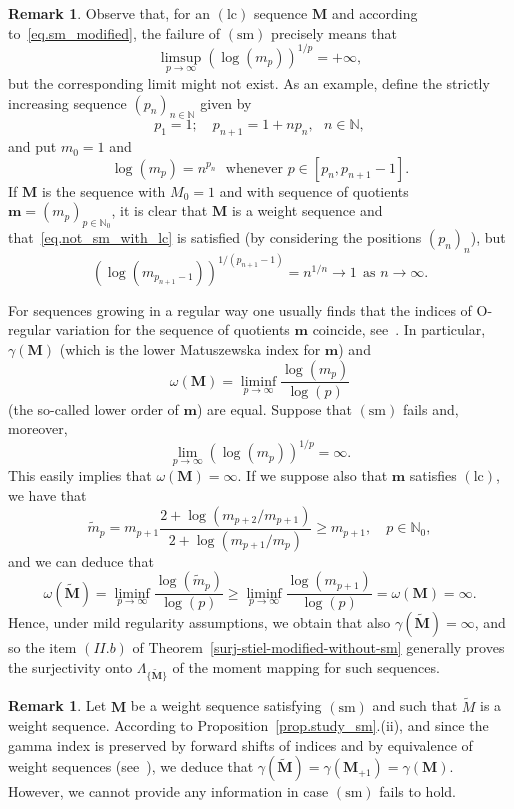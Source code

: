 \documentclass[12pt,a4paper]{article}
\newcommand{\N}{\mathbb{N}}
\newcommand{\M}{{\boldsymbol{M}}}
\newcommand{\m}{{\boldsymbol{m}}}
\newcommand{\lc}{\operatorname{(lc)}}
\newcommand{\sm}{\operatorname{(sm)}}
\newcommand{\ga}{\gamma}
\theoremstyle{plain}
\theoremstyle{definition}
\newtheorem{remark}[theorem]{Remark}
\numberwithin{equation}{section}
\begin{document}
\begin{remark}\label{rem.indices_infinity_when_sm_fails}
Observe that, for an $\lc$ sequence $\M$ and according to~\eqref{eq.sm_modified}, the failure of $\sm$ precisely means that
\begin{equation}\label{eq.not_sm_with_lc}
\limsup_{p\to\infty}\left(\log(m_p)\right)^{1/p}=+\infty,
\end{equation}
but the corresponding limit might not exist. As an example, define the strictly increasing sequence $(p_n)_{n\in\N}$ given by
$$
p_1=1;\quad p_{n+1}=1+np_n,\ \ \ n\in\N,
$$
and put $m_0=1$ and
$$
\log(m_p)=n^{p_n}\ \ \ \textrm{whenever }p\in[p_n,p_{n+1}-1].
$$
If $\M$ is the sequence with $M_0=1$ and with sequence of quotients $\m=(m_p)_{p\in\N_0}$, it is clear that $\M$ is a weight sequence and that~\eqref{eq.not_sm_with_lc} is satisfied (by considering the positions $(p_n)_n$), but
$$
\left(\log(m_{p_{n+1}-1})\right)^{1/(p_{n+1}-1)}=n^{1/n}\to 1\ \ \textrm{as }n\to\infty.
$$

For sequences growing in a regular way one usually finds that the indices of O-regular variation for the sequence of quotients $\m$ coincide, see~\cite[Section 3]{JimenezSanzSchindlIndex}. In particular, $\ga(\M)$ (which is the lower Matuszewska index for $\m$) and
$$
\omega(\M)=\liminf_{p\to\infty}\frac{\log(m_p)}{\log(p)}
$$
(the so-called lower order of $\m$) are equal. Suppose that $\sm$ fails and, moreover,
$$
\lim_{p\to\infty}\left(\log(m_p)\right)^{1/p}=\infty.
$$
This easily implies that $\omega(\M)=\infty$. If we suppose also that $\m$ satisfies $\lc$, we have that
\begin{equation*}
\widetilde{m}_p=m_{p+1} \frac{2+\log(m_{p+2}/m_{p+1})}{2+\log(m_{p+1}/m_{p})}\ge m_{p+1}, \quad p\in\N_0,
\end{equation*}
and we can deduce that
$$
\omega(\widetilde{\M})=\liminf_{p\to\infty} \frac{\log(\widetilde{m}_p)}{\log(p)}\ge
\liminf_{p\to\infty}\frac{\log(m_{p+1})}{\log(p)}=\omega(\M)=\infty.
$$
Hence, under mild regularity assumptions, we obtain that also $\ga(\widetilde{\M})=\infty$, and so the item $(II.b)$ of Theorem~\ref{surj-stiel-modified-without-sm} generally proves the surjectivity onto $\Lambda_{\{\widetilde{\M}\}}$ of the moment mapping for such sequences.
\end{remark}

\begin{remark}\label{rem.gamma_index_tildeM}
Let $\M$ be a weight sequence satisfying $\sm$ and such that $\widetilde{M}$ is a weight sequence. According to Proposition~\ref{prop.study_sm}.(ii), and since the gamma index is preserved by forward shifts of indices and by equivalence of weight sequences (see~\cite[Corollary 3.14]{JimenezSanzSchindlIndex}), we deduce that $\gamma(\widetilde{\M})=\gamma(\M_{+1})=\gamma(\M)$. However, we cannot provide any information in case $\sm$ fails to hold.
\end{remark}
\end{document}
